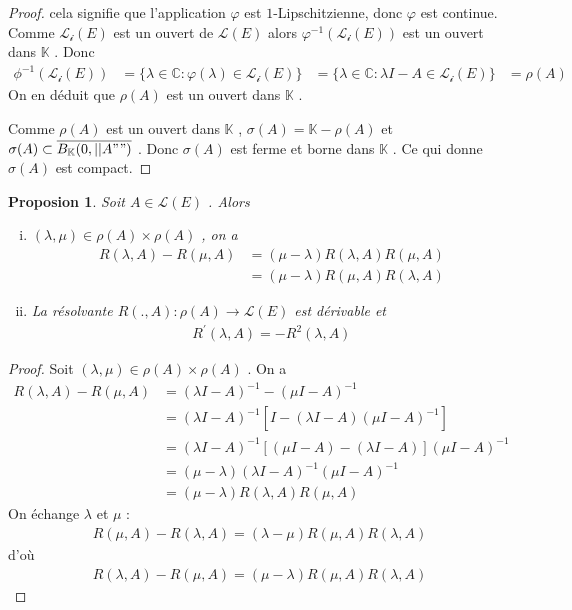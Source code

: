 \documentclass{report}
\newtheorem{Prop}{Proposion}[subsection]
\begin{document}
{\begin{proof}
cela signifie que l'application $\varphi$ est $1$-Lipschitzienne, donc $\varphi$ est continue. Comme $\mathscr{L_i}(E)$ est un ouvert de $\mathscr{L}(E)$ alors $\varphi^{-1} (\mathscr{L_i}(E))$ est un ouvert dans $\mathbb{K}$ . Donc 
					\begin{align*}
				 \phi^{-1}(\mathscr{L_i}(E)) &= \{\lambda \in \mathbb{C} : \varphi(\lambda) \in \mathscr{L_i}(E)\} 
				 &= \{\lambda \in \mathbb{C} : \lambda I - A \in \mathscr{L_i}(E)\} 
				 &= \rho(A) 
					\end{align*}
On en déduit que $\rho(A)$ est un ouvert dans $\mathbb{K}$ .

 Comme $\rho(A)$ est un ouvert dans $\mathbb{K}$ , $\sigma(A) = \mathbb{K} - \rho(A)$ et $\sigma(A) \subset \overline{B_{\mathbb{K}}(0,||A"")}$ . Donc $\sigma(A)$ est ferme et borne dans $\mathbb{K}$ . Ce qui donne $\sigma(A)$ est compact.
\end{proof}


\begin{Prop} Soit $A \in \mathscr{L}(E)$ . Alors 
\begin{enumerate}[i)]
	\item   $(\lambda, \mu) \in \rho(A) \times \rho(A)$ , on a 
									\begin{align*}
				 R(\lambda, A) - R(\mu, A) &= (\mu - \lambda) R(\lambda, A)R(\mu, A) \\
				 &= (\mu - \lambda)R(\mu, A)R(\lambda, A) 
									\end{align*}
	\item La résolvante $R(.,A): \rho(A) \rightarrow \mathscr{L}(E)$ est dérivable et 
									\begin{align*}	
				 R^{'} (\lambda, A) = - R^2(\lambda, A)
									\end{align*}
\end{enumerate}
\end{Prop}
\begin{proof}
 Soit $(\lambda, \mu) \in \rho(A) \times \rho(A)$ . On a 
					\begin{align*}
					 R(\lambda, A) - R(\mu, A) &= (\lambda I - A)^{-1} - (\mu I - A)^{-1} \\
					 &= (\lambda I - A)^{-1} [ I - (\lambda I - A)(\mu I - A)^{-1} ] \\
					 &= (\lambda I - A)^{-1} [(\mu I - A) - (\lambda I - A)] (\mu I - A)^{-1} \\
					 &= (\mu - \lambda) (\lambda I - A)^{-1} (\mu I - A)^{-1} \\
					 &= (\mu - \lambda) R(\lambda, A) R(\mu, A) 
					\end{align*}
On échange $\lambda$ et $\mu$ : 
					\begin{align*}
					 R(\mu,A) - R(\lambda, A) = (\lambda - \mu) R(\mu,A) R(\lambda, A) 
					\end{align*}
d'où  
					\begin{align*}
					 R(\lambda, A) - R(\mu, A) = (\mu - \lambda) R(\mu, A) R(\lambda, A) 
					\end{align*}


\end{proof}}
\end{document}
